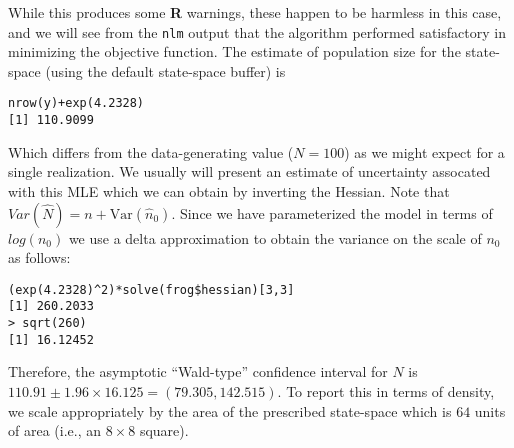 While this produces some {\bf R} warnings, these happen to be harmless
in this case, and we will see from the \mbox{\tt nlm} output that the
algorithm performed satisfactory in minimizing the objective function.
The estimate of population size for the state-space (using the default 
state-space buffer) is
\begin{verbatim}
nrow(y)+exp(4.2328)
[1] 110.9099
\end{verbatim}
Which differs from the data-generating value ($N=100$) as we might
expect for a single realization. We usually will present an estimate of uncertainty assocated
with this MLE which we can obtain by inverting the Hessian. Note that
$Var(\hat{N}) = n + \mbox{Var}(\hat{n}_{0})$.
Since we
have parameterized the model in terms of $log(n_{0})$ we use a delta
approximation to obtain the variance on the scale of $n_{0}$ as
follows:
\begin{verbatim}
(exp(4.2328)^2)*solve(frog$hessian)[3,3]
[1] 260.2033
> sqrt(260)
[1] 16.12452
\end{verbatim}
Therefore, the asymptotic ``Wald-type'' confidence interval for $N$ is
$110.91 \pm 1.96 \times 16.125 = (79.305, 142.515)$. To report this in
terms of density, we scale appropriately by the area of the prescribed
state-space which is $64$ units of area (i.e., an $8 \times 8$ square).


\begin{comment}

\subsection{Exercises}

{\flushleft 
{\bf 1.}	
Run the analysis with different state-space buffers and comment on the result. 
}


{\flushleft 
{\bf 2.} Conduct a brief simulation study using this code by
  simulating 100 data sets and obtain the MLEs for each data set. Do
  things seem to be working as you expect?  }

{\flushleft 
{\bf 3.} 
Further extensions: It should be straightforward to
  generalize the integrated likelihood function to accommodate many
  different situations. For examples, if we want to include more
  covariates in the model we can just add stuff to the object \mbox{\tt probcap},
 and add the relevant parameters to the argument that gets
  passed to the main  function.  For the simulated data, make up a
  covariate by generating a Bernoulli covariate (``trap type'' – perhaps
  baited or not baited) randomly and try to modify the likelihood to
  accommodate that.  }

{\flushleft {\bf 4.}  We would probably be interested in devising the
  integrated likelihood for the full 3-d encounter history array so
  that we could include temporally varying covariates. This is not
  difficult but naturally will slow down the execution
  substantially. The interested reader should try to expand the
  capabilities of this basic {\bf R} function.  }
\end{comment}




